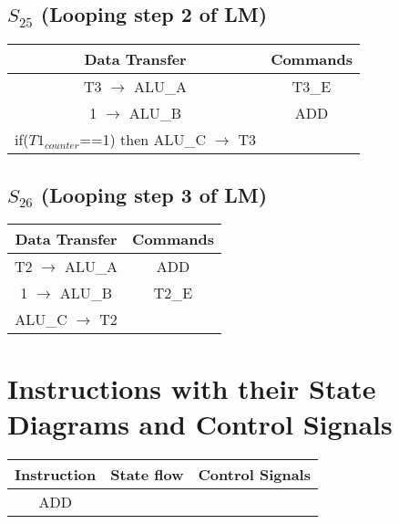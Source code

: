 \documentclass[]{article}
\begin{document}
            \subsection*{$S_{25}$ (Looping step 2 of LM)} %
            \begin{center}
                \begin{tabular}{|c|c|}
                    \hline
                    Data Transfer & Commands \\
                    \hline
                    T3 $\to$ ALU\_A & T3\_E\\
                    1 $\to$ ALU\_B & ADD\\
                    if($T1_{counter}$==1) then ALU\_C $\to$ T3 & \\
                    \hline
                \end{tabular}
            \end{center} 
            \subsection*{$S_{26}$ (Looping step 3 of LM)} %
            \begin{center}
                \begin{tabular}{|c|c|}
                    \hline
                    Data Transfer & Commands \\
                    \hline
                    T2 $\to$ ALU\_A & ADD\\
                    1 $\to$ ALU\_B & T2\_E\\        %
                    ALU\_C $\to$ T2 & \\
                    \hline
                \end{tabular}
            \end{center} 
    \section*{Instructions with their State Diagrams and Control Signals}
        \begin{center}
            \begin{tabular}{|c|c|c|}
                \hline
                Instruction & State flow & Control Signals \\
                \hline
                ADD & \\
                \hline
            \end{tabular}
        \end{center} 
\end{document}
